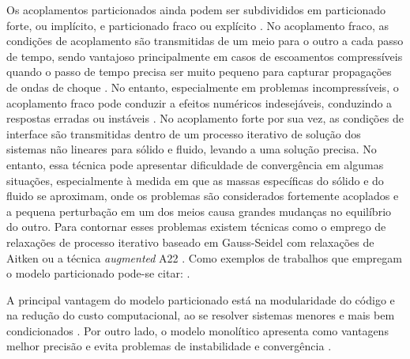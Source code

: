 Os acoplamentos particionados ainda podem ser subdivididos em particionado forte, ou implícito, e particionado fraco ou explícito \cite{Felippaetal2001}. No acoplamento fraco, as condições de acoplamento são transmitidas de um meio para o outro a cada passo de tempo, sendo vantajoso principalmente em casos de escoamentos compressíveis quando o passo de tempo precisa ser muito pequeno para capturar propagações de ondas de choque \cite{sanches2011acoplamento,sanches2014fluid,sanches2013unconstrained}. No entanto, especialmente em problemas incompressíveis, o acoplamento fraco pode conduzir a efeitos numéricos indesejáveis, conduzindo a respostas erradas ou instáveis \cite{Felippaetal2001, fernandes2019ale}. No acoplamento forte por sua vez, as condições de interface são transmitidas dentro de um processo iterativo de solução dos sistemas não lineares para sólido e fluido, levando a uma solução precisa. No entanto, essa técnica pode apresentar dificuldade de convergência em algumas situações, especialmente à medida em que as massas específicas do sólido e do fluido se aproximam, onde os problemas são considerados fortemente acoplados e a pequena perturbação em um dos meios causa grandes mudanças no equilíbrio do outro. Para contornar esses problemas existem técnicas como o emprego de relaxações de processo iterativo baseado em Gauss-Seidel com relaxações de Aitken \cite{fernandes2019ale} ou a técnica \textit{augmented} A22 \cite{tezduyar2005finite}. Como exemplos de trabalhos que empregam o modelo particionado pode-se citar: .

A principal vantagem do modelo particionado está na modularidade do código e na redução do custo computacional, ao se resolver sistemas menores e mais bem condicionados \cite{sanches2011acoplamento,fernandes2020tecnica}. Por outro lado, o modelo monolítico apresenta como vantagens melhor precisão e evita problemas de instabilidade e convergência \cite{Acanvini2023formulacao}.